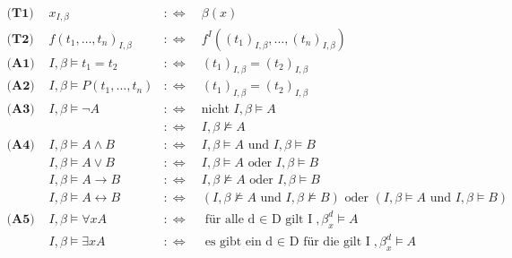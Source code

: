 \documentclass{article}
\begin{document}
			\begin{align*}
				\textbf{(T1) } & x_{I, \beta} & :\Leftrightarrow\ & \beta(x)\\
				\textbf{(T2) } & f(t_1, \ldots, t_n)_{I, \beta} &:\Leftrightarrow\ &  f^I((t_1)_{I, \beta}, \ldots, (t_n)_{I, \beta})\\
				\textbf{(A1) } & I, \beta \models t_1 = t_2 &:\Leftrightarrow\ &  (t_1)_{I, \beta} = (t_2)_{I, \beta}\\
				\textbf{(A2) } & I, \beta \models P(t_1, \ldots, t_n) &:\Leftrightarrow\ &  (t_1)_{I, \beta} = (t_2)_{I, \beta}\\
				\textbf{(A3) } & I, \beta \models \neg A &:\Leftrightarrow\ & \text{nicht } I, \beta \models A \\
				& & :\Leftrightarrow\ &  I, \beta \not\models A\\
				\textbf{(A4) } & I, \beta \models A \wedge B &:\Leftrightarrow\ &  I, \beta \models A \text{ und } I, \beta \models B\\
				& I, \beta \models A \vee B & :\Leftrightarrow\ & I, \beta \models A \text{ oder } I, \beta \models B\\
				& I, \beta \models A \rightarrow B & :\Leftrightarrow\ & I, \beta \not\models A \text{ oder } I, \beta \models B\\
				& I, \beta \models A \leftrightarrow B & :\Leftrightarrow\ & (I, \beta \not\models A \text{ und } I, \beta \not\models B) \text{ oder } (I, \beta \models A \text{ und } I, \beta \models B)\\
				\textbf{(A5) } & I, \beta \models \forall x A & :\Leftrightarrow\ & \text{f\"ur alle d $\in$ D gilt I}, \beta^{d}_{x} \models A\\
				& I, \beta \models \exists xA & :\Leftrightarrow\ & \text{es gibt ein d $\in$ D f\"ur die gilt I}, \beta^{d}_{x} \models A\\
			\end{align*}
\end{document}
